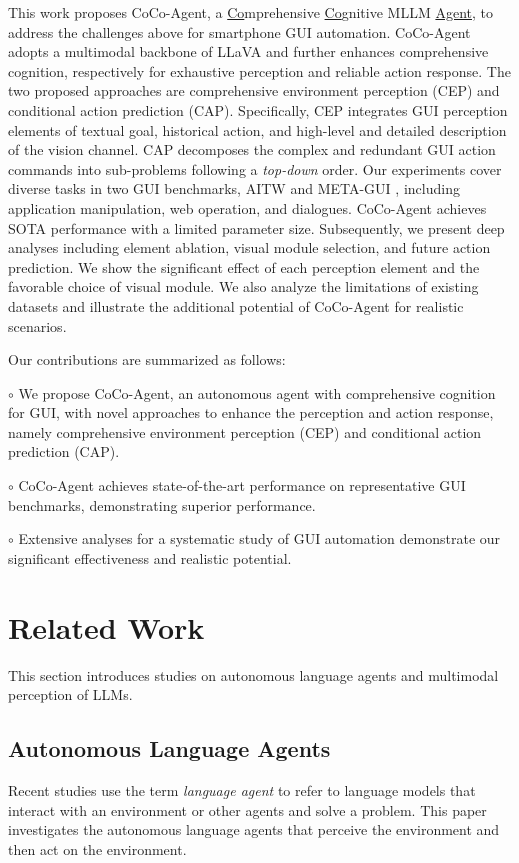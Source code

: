 This work proposes CoCo-Agent, a \underline{Co}mprehensive \underline{Co}gnitive MLLM \underline{Agent}, to address the challenges above for smartphone GUI automation.
CoCo-Agent adopts a multimodal backbone of LLaVA \cite{liu2023llava} and further enhances comprehensive cognition, respectively for exhaustive perception and reliable action response.
The two proposed approaches are 
comprehensive environment perception (CEP) and conditional action prediction (CAP).
Specifically, CEP integrates GUI perception elements of textual goal, historical action, and high-level and detailed description of the vision channel.
CAP decomposes the complex and redundant GUI action commands into sub-problems following a \textit{top-down} order.
Our experiments cover diverse tasks in two GUI benchmarks, AITW \cite{rawles2023android} and META-GUI \cite{sun-etal-2022-meta}, including application manipulation, web operation, and dialogues. CoCo-Agent achieves SOTA performance with a limited parameter size.
Subsequently, we present deep analyses including element ablation, visual module selection, and future action prediction.
We show the significant effect of each perception element and the favorable choice of visual module.
We also analyze the limitations of existing datasets and illustrate the additional potential of CoCo-Agent for realistic scenarios.

Our contributions are summarized as follows:

$\circ$ We propose CoCo-Agent, an autonomous agent with comprehensive cognition for GUI, with novel approaches to enhance the perception and action response, namely comprehensive environment perception (CEP) and conditional action prediction (CAP).

$\circ$ CoCo-Agent achieves state-of-the-art performance on representative GUI benchmarks, demonstrating superior performance.

$\circ$ Extensive analyses for a systematic study of GUI automation demonstrate our significant effectiveness and realistic potential.

\section{Related Work}
This section introduces studies on autonomous language agents and multimodal perception of LLMs.

\subsection{Autonomous Language Agents}
Recent studies \cite{li2023camel, autogpt} use the term \textit{language agent} to refer to language models that interact with an environment or other agents and solve a problem.
This paper investigates the autonomous language agents that perceive the environment and then act on the environment. 

